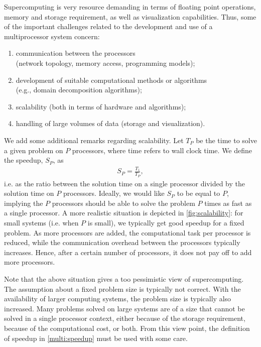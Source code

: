Supercomputing is very resource demanding in terms of floating point operations,
memory and storage requirement, as well as visualization capabilities. Thus,
some of the important challenges related to the development and use of a
multiprocessor system concern:
\begin{enumerate}
\item communication between the processors \\
(network topology, memory access, programming models);
\item development of suitable computational methods or algorithms \\
(e.g., domain decomposition algorithms);
\item scalability (both in terms of hardware and algorithms);
\item handling of large volumes of data (storage and visualization).
\end{enumerate}

We add some additional remarks regarding scalability. Let $T_P$ be the time to
solve a given problem on $P$ processors, where time refers to wall clock time.
We define the speedup, $S_P$, as
\begin{align}
S_P = \frac{T_1}{T_P},
\label{multi:speedup}
\end{align}
i.e. as the ratio between the solution time on a single processor divided by the
solution time on $P$ processors. Ideally, we would like $S_P$ to be equal to
$P$, implying the $P$ processors should be able to solve the problem $P$ times
as fast as a single processor. A more realistic situation is depicted in
\autoref{fig:scalability}: for small systems (i.e. when $P$ is small), we
typically get good speedup for a fixed problem. As more processors are added,
the computational task per processor is reduced, while the communication
overhead between the processors typically increases. Hence, after a certain
number of processors, it does not pay off to add more processors.

Note that the above situation gives a too pessimistic view of supercomputing.
The assumption about a fixed problem size is typically not correct. With the
availability of larger computing systems, the problem size is typically also
increased. Many problems solved on large systems are of a size that cannot be
solved in a single processor context, either because of the storage requirement,
because of the computational cost, or both. From this view point, the definition
of speedup in \eqref{multi:speedup} must be used with some care.

